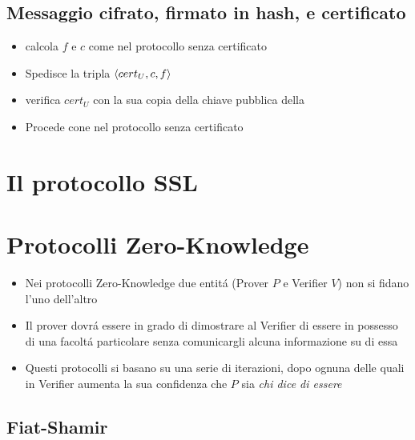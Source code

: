 \subsection{Messaggio cifrato, firmato in hash, e certificato}

\begin{itemize}
    \item {} calcola $f$ e $c$ come nel protocollo senza certificato
    \item Spedisce la tripla $\langle cert_U, c, f\rangle$
    \item {} verifica $cert_U$ con la sua copia della chiave pubblica della 
    \item Procede cone nel protocollo senza certificato
\end{itemize}

\section{Il protocollo SSL}

\section{Protocolli Zero-Knowledge}

\begin{itemize}
    \item Nei protocolli Zero-Knowledge due entit\'a (Prover $P$ e Verifier $V$) non si fidano l'uno dell'altro
    \item Il prover dovr\'a essere in grado di dimostrare al Verifier di essere in possesso di una facolt\'a particolare senza comunicargli alcuna informazione su di essa
    \item Questi protocolli si basano su una serie di iterazioni, dopo ognuna delle quali in Verifier aumenta la sua confidenza che $P$ sia \textit{chi dice di essere}
\end{itemize}

\subsection{Fiat-Shamir}

